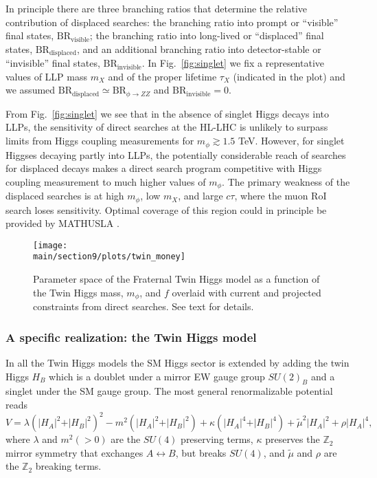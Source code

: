 In principle there are three branching ratios that determine the relative contribution of displaced searches: the branching ratio into prompt or ``visible'' final states, $\text{BR}_{\text{visible}}$; the branching ratio into long-lived or ``displaced'' final states, $\text{BR}_{\text{displaced}}$, and an additional branching ratio into detector-stable or ``invisible'' final states, $\text{BR}_{\text{invisible}}$. In Fig.~\ref{fig:singlet} we fix a representative values of LLP mass $m_X$ and of the proper lifetime $\tau_X$ (indicated in the plot) and we assumed $ \text{BR}_{\text{displaced}} \simeq \text{BR}_{\phi \rightarrow ZZ}$ and $\text{BR}_{\text{invisible}} = 0$. 

From Fig.~\ref{fig:singlet} we see that in the absence of singlet Higgs decays into LLPs, the sensitivity of direct searches at the HL-LHC is unlikely to surpass limits from Higgs coupling measurements for $m_\phi \gtrsim 1.5$ TeV. However, for singlet Higgses decaying partly into LLPs, the potentially considerable reach of searches for displaced decays makes a direct search program competitive with Higgs coupling measurement to much higher values of $m_\phi$. The primary weakness of the displaced searches is at high $m_\phi$, low $m_X$, and large $c \tau$, where the muon RoI search loses sensitivity. Optimal coverage of this region could in principle be provided by MATHUSLA \cite{Curtin:2018mvb}.


\begin{figure}[h!]
\centering
\texttt{[image: \\main/section9/plots/twin\_money]}
\caption{Parameter space of the Fraternal Twin Higgs model as a function of the Twin Higgs mass, $m_\phi$, and $f$ overlaid with current and projected constraints from direct searches. See text for details.
\label{fig:twinmoney}
}
\end{figure}


\subsubsection{A specific realization: the Twin Higgs model}
In all the Twin Higgs models the SM Higgs sector is extended by adding the twin Higgs $H_B$ which is a doublet under a mirror EW gauge group $SU(2)_B$ and a singlet under the SM gauge group. The most general renormalizable potential reads 
\begin{equation}
V=\lambda\left(\vert H_A\vert^2+\vert H_B\vert^2\right)^2-m^2\left(\vert H_A\vert^2+\vert H_B\vert^2\right)+\kappa\left(\vert H_A\vert^4+\vert H_B\vert^4\right)+\tilde{\mu}^2\vert H_A\vert^2+\rho \vert H_A\vert^4,\label{eq:V_TH}
\end{equation}
where $\lambda$ and $m^2 (>0)$ are the $SU(4)$ preserving terms, $\kappa$ preserves the $\mathbb{Z}_2$ mirror symmetry that exchanges $A\leftrightarrow B$, but breaks $SU(4)$, and $\tilde\mu$ and $\rho$ are the $\mathbb{Z}_2$ breaking terms.

